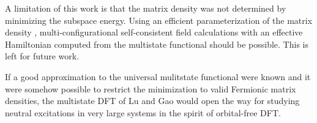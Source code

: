 \documentclass[journal=jpclcd,manuscript=letter]{achemso}
\begin{document}
A limitation of this work is that the matrix density was not determined by minimizing the subspace energy.
Using an efficient parameterization of the matrix density \cite[theorem (3)]{Lu2022JPCL} \cite{Lu2022fundamental},
multi-configurational self-consistent field calculations with an effective Hamiltonian computed from the multistate functional
should be possible. This is left for future work.

If a good approximation to the universal mulitstate functional
were known and it were somehow possible to restrict the minimization to valid Fermionic matrix densities,
the multistate DFT of Lu and Gao would open the way for studying neutral excitations in very large systems
in the spirit of orbital-free DFT.









\end{document}
